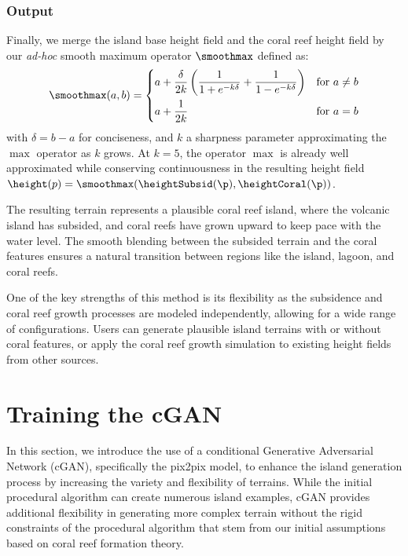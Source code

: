 \documentclass{egpubl}
\begin{document}
\subsubsection{Output}
\label{sec:coral-island_procedural-output}

Finally, we merge the island base height field and the coral reef height field by our \textit{ad-hoc} smooth maximum operator $\smoothmax$ defined as:
\begin{align}
    \smoothmax(a, b) = \begin{dcases}
        a + \frac{\delta}{2k} \left( \frac{1}{1+e^{-k\delta}} + \frac{1}{1-e^{-k\delta}} \right) &\text{for } a \neq b \\
        a + \frac{1}{2k} &\text{for } a = b
    \end{dcases}
\end{align} 
with $\delta=b-a$ for conciseness, and $k$ a sharpness parameter approximating the $\max$ operator as $k$ grows. At $k=5$, the operator $\max$ is already well approximated while conserving continuousness in the resulting height field $\height(p) = \smoothmax(\heightSubsid(\p), \heightCoral(\p))$.

The resulting terrain represents a plausible coral reef island, where the volcanic island has subsided, and coral reefs have grown upward to keep pace with the water level. The smooth blending between the subsided terrain and the coral features ensures a natural transition between regions like the island, lagoon, and coral reefs.

One of the key strengths of this method is its flexibility as the subsidence and coral reef growth processes are modeled independently, allowing for a wide range of configurations. Users can generate plausible island terrains with or without coral features, or apply the coral reef growth simulation to existing height fields from other sources.







\section{Training the cGAN}

In this section, we introduce the use of a conditional Generative Adversarial Network (cGAN), specifically the pix2pix model, to enhance the island generation process by increasing the variety and flexibility of terrains. While the initial procedural algorithm can create numerous island examples, cGAN provides additional flexibility in generating more complex terrain without the rigid constraints of the procedural algorithm that stem from our initial assumptions based on coral reef formation theory.
\end{document}
